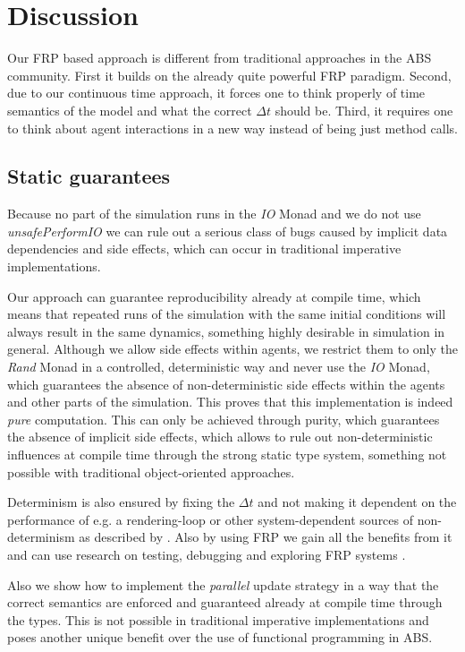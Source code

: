 \section{Discussion}
Our FRP based approach is different from traditional approaches in the ABS community. First it builds on the already quite powerful FRP paradigm. Second, due to our continuous time approach, it forces one to think properly of time semantics of the model and what the correct $\Delta t$ should be. Third, it requires one to think about agent interactions in a new way instead of being just method calls.

\subsection{Static guarantees}
Because no part of the simulation runs in the \textit{IO} Monad and we do not use \textit{unsafePerformIO} we can rule out a serious class of bugs caused by implicit data dependencies and side effects, which can occur in traditional imperative implementations.

Our approach can guarantee reproducibility already at compile time, which means that repeated runs of the simulation with the same initial conditions will always result in the same dynamics, something highly desirable in simulation in general. Although we allow side effects within agents, we restrict them to only the \textit{Rand} Monad in a controlled, deterministic way and never use the \textit{IO} Monad, which guarantees the absence of non-deterministic side effects within the agents and other parts of the simulation. This proves that this implementation is indeed \textit{pure} computation. This can only be achieved through purity, which guarantees the absence of implicit side effects, which allows to rule out non-deterministic influences at compile time through the strong static type system, something not possible with traditional object-oriented approaches.

Determinism is also ensured by fixing the $\Delta t$ and not making it dependent on the performance of e.g. a rendering-loop or other system-dependent sources of non-determinism as described by \cite{perez_testing_2017}. Also by using FRP we gain all the benefits from it and can use research on testing, debugging and exploring FRP systems \cite{perez_back_2017,perez_testing_2017}.

Also we show how to implement the \textit{parallel} update strategy \cite{thaler_art_2017} in a way that the correct semantics are enforced and guaranteed already at compile time through the types. This is not possible in traditional imperative implementations and poses another unique benefit over the use of functional programming in ABS.

